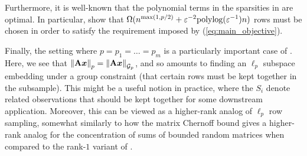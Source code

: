 \documentclass[11pt]{article}
\numberwithin{equation}{section}
\begin{document}
Furthermore, it is well-known that the polynomial terms in the sparsities in  are optimal. In particular, \citet[Corollary 1.6 and Theorem 1.7]{lww19} show that $\Omega(n^{\max(1,p/2)}+\varepsilon^{-2}\mathrm{polylog}(\varepsilon^{-1})n)$ rows must be chosen in order to satisfy the requirement imposed by (\ref{eq:main_objective}).

Finally, the setting where $p = p_1 = \dots = p_m$ is a particularly important case of . Here, we see that $\left\lVert \mathbf{A}\bm{x} \right\rVert_p = \left\lVert \mathbf{A}\bm{x} \right\rVert_{\mathcal{G}_{p}}$, and so  amounts to finding an $\ell_p$ subspace embedding under a group constraint (that certain rows must be kept together in the subsample). This might be a useful notion in practice, where the $S_i$ denote related observations that should be kept together for some downstream application. Moreover, this can be viewed as a higher-rank analog of $\ell_p$ row sampling, somewhat similarly to how the matrix Chernoff bound gives a higher-rank analog for the concentration of sums of bounded random matrices when compared to the rank-$1$ variant of \citet{rudelson1996}.


\end{document}
